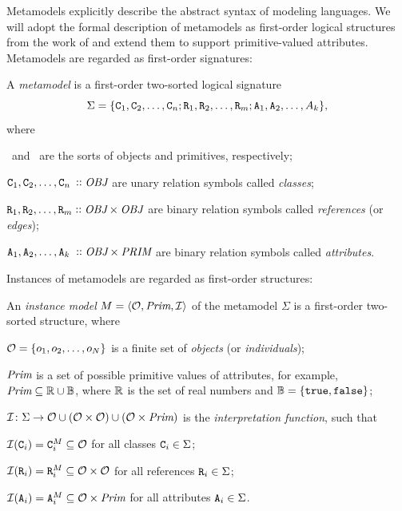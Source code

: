 Metamodels explicitly describe the abstract syntax of modeling languages. We will adopt the formal description of metamodels as first-order logical structures from the work of \citet{Varro17generation} and extend them to support primitive-valued attributes. Metamodels are regarded as first-order signatures:

\begin{dfn}
  A \emph{metamodel} is a first-order two-sorted logical signature
  \begin{equation}
    \Sigma = \{\texttt{\upshape C}_1, \texttt{\upshape C}_2, \ldots, \texttt{\upshape C}_n; \texttt{\upshape R}_1, \texttt{\upshape R}_2, \ldots, \texttt{\upshape R}_m; \texttt{\upshape A}_1, \texttt{\upshape A}_2, \ldots, A_k\} \text,
  \end{equation}
  where
  \begin{compactitem}
  \item \OBJsort\ and \PRIMsort\ are the sorts of objects and primitives, respectively;
  \item \(\lit C_1, \lit C_2, \ldots, \lit C_{\mathrlap{n}\phantom{m}} \ofkind \OBJsort\) are unary relation symbols called \emph{classes};
  \item \(\texttt{\upshape R}_1, \texttt{\upshape R}_2, \ldots, \texttt{\upshape R}_m \mathrel{\vcentcolon\vcentcolon} \textit{OBJ} \times \textit{OBJ}\) are binary relation symbols called \emph{references} (or \emph{edges});
  \item \(\lit A_1, \lit A_2, \ldots, \lit A_{\mathrlap{k}\phantom{m}} \ofkind \OBJsort \times \PRIMsort\) are binary relation symbols called \emph{attributes}.
  \end{compactitem}
\end{dfn}

Instances of metamodels are regarded as first-order structures:

\begin{dfn}
  An \emph{instance model} \(M = \langle \mathcal{O}, \textit{Prim}, \mathcal{I} \rangle\) of the metamodel \(\Sigma\) is a first-order two-sorted structure, where
  \begin{compactitem}
  \item \(\mathcal{O} = \{o_1, o_2, \ldots, o_N\}\) is a finite set of \emph{objects} (or \emph{individuals});
  \item \(\textit{Prim}\) is a set of possible primitive values of attributes, for example, \(\textit{Prim} \subseteq \mathbb{R} \cup \mathbb{B}\), where \(\mathbb{R}\) is the set of real numbers and \(\mathbb{B} = \{\texttt{\upshape true}, \texttt{\upshape false}\}\);
  \item \(\mathcal{I}\colon \Sigma \to \mathcal{O} \cup (\mathcal{O} \times \mathcal{O}) \cup (\mathcal{O} \times \textit{Prim})\) is the \emph{interpretation function}, such that
    \begin{compactitem}
    \item \(\mathcal{I}(\texttt{\upshape C}_i) = \texttt{\upshape C}_i^M \subseteq \mathcal{O}\) for all classes \(\texttt{\upshape C}_i \in \Sigma\);
    \item \(\mathcal{I}(\texttt{\upshape R}_i) = \texttt{\upshape R}_i^M \subseteq \mathcal{O} \times \mathcal{O}\) for all references \(\texttt{\upshape R}_i \in \Sigma\);
    \item \(\mathcal{I}(\texttt{\upshape A}_i) = \texttt{\upshape A}_i^M \subseteq \mathcal{O} \times \textit{Prim}\) for all attributes \(\texttt{\upshape A}_i \in \Sigma\).
    \end{compactitem}
  \end{compactitem}
\end{dfn}

